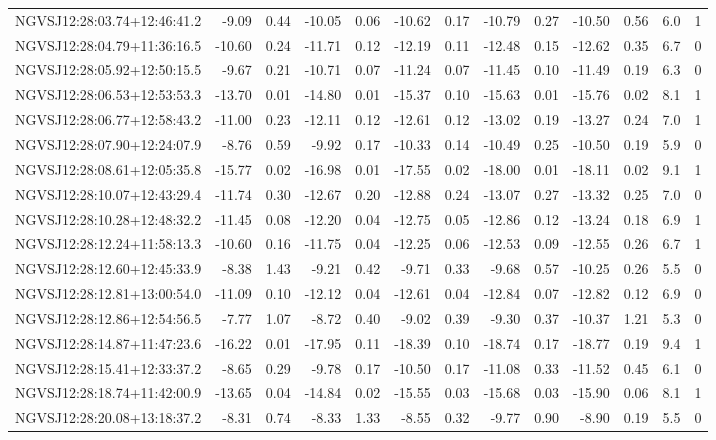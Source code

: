 \begin{tabular}{lrrrrrrrrrrcc}
NGVSJ12:28:03.74+12:46:41.2 & -9.09 & 0.44 & -10.05 & 0.06 & -10.62 & 0.17 & -10.79 & 0.27 & -10.50 & 0.56 & 6.0 & 1 \\
NGVSJ12:28:04.79+11:36:16.5 & -10.60 & 0.24 & -11.71 & 0.12 & -12.19 & 0.11 & -12.48 & 0.15 & -12.62 & 0.35 & 6.7 & 0 \\
NGVSJ12:28:05.92+12:50:15.5 & -9.67 & 0.21 & -10.71 & 0.07 & -11.24 & 0.07 & -11.45 & 0.10 & -11.49 & 0.19 & 6.3 & 0 \\
NGVSJ12:28:06.53+12:53:53.3 & -13.70 & 0.01 & -14.80 & 0.01 & -15.37 & 0.10 & -15.63 & 0.01 & -15.76 & 0.02 & 8.1 & 1 \\
NGVSJ12:28:06.77+12:58:43.2 & -11.00 & 0.23 & -12.11 & 0.12 & -12.61 & 0.12 & -13.02 & 0.19 & -13.27 & 0.24 & 7.0 & 1 \\
NGVSJ12:28:07.90+12:24:07.9 & -8.76 & 0.59 & -9.92 & 0.17 & -10.33 & 0.14 & -10.49 & 0.25 & -10.50 & 0.19 & 5.9 & 0 \\
NGVSJ12:28:08.61+12:05:35.8 & -15.77 & 0.02 & -16.98 & 0.01 & -17.55 & 0.02 & -18.00 & 0.01 & -18.11 & 0.02 & 9.1 & 1 \\
NGVSJ12:28:10.07+12:43:29.4 & -11.74 & 0.30 & -12.67 & 0.20 & -12.88 & 0.24 & -13.07 & 0.27 & -13.32 & 0.25 & 7.0 & 0 \\
NGVSJ12:28:10.28+12:48:32.2 & -11.45 & 0.08 & -12.20 & 0.04 & -12.75 & 0.05 & -12.86 & 0.12 & -13.24 & 0.18 & 6.9 & 1 \\
NGVSJ12:28:12.24+11:58:13.3 & -10.60 & 0.16 & -11.75 & 0.04 & -12.25 & 0.06 & -12.53 & 0.09 & -12.55 & 0.26 & 6.7 & 1 \\
NGVSJ12:28:12.60+12:45:33.9 & -8.38 & 1.43 & -9.21 & 0.42 & -9.71 & 0.33 & -9.68 & 0.57 & -10.25 & 0.26 & 5.5 & 0 \\
NGVSJ12:28:12.81+13:00:54.0 & -11.09 & 0.10 & -12.12 & 0.04 & -12.61 & 0.04 & -12.84 & 0.07 & -12.82 & 0.12 & 6.9 & 0 \\
NGVSJ12:28:12.86+12:54:56.5 & -7.77 & 1.07 & -8.72 & 0.40 & -9.02 & 0.39 & -9.30 & 0.37 & -10.37 & 1.21 & 5.3 & 0 \\
NGVSJ12:28:14.87+11:47:23.6 & -16.22 & 0.01 & -17.95 & 0.11 & -18.39 & 0.10 & -18.74 & 0.17 & -18.77 & 0.19 & 9.4 & 1 \\
NGVSJ12:28:15.41+12:33:37.2 & -8.65 & 0.29 & -9.78 & 0.17 & -10.50 & 0.17 & -11.08 & 0.33 & -11.52 & 0.45 & 6.1 & 0 \\
NGVSJ12:28:18.74+11:42:00.9 & -13.65 & 0.04 & -14.84 & 0.02 & -15.55 & 0.03 & -15.68 & 0.03 & -15.90 & 0.06 & 8.1 & 1 \\
NGVSJ12:28:20.08+13:18:37.2 & -8.31 & 0.74 & -8.33 & 1.33 & -8.55 & 0.32 & -9.77 & 0.90 & -8.90 & 0.19 & 5.5 & 0 \\

\end{tabular}
